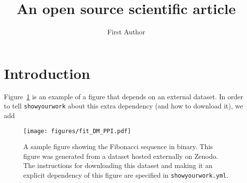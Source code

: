\documentclass[twocolumn]{aastex631}
\begin{document}
\title{An open source scientific article}

\author{First Author}

\begin{abstract}
    \blindtext
\end{abstract}

\section{Introduction}

Figure~\ref{fig:fit_DM_PPI} is an example of a figure that depends on an external dataset.
In order to tell \texttt{showyourwork} about this extra dependency (and how to download it), we add %

\begin{figure}[ht!]
    \begin{centering}
        \texttt{[image: figures/fit\_DM\_PPI.pdf]}
        \caption{
            A sample figure showing the Fibonacci sequence in binary.
            This figure was generated from a dataset hosted externally on Zenodo.
            The instructions for downloading this dataset and making it an explicit dependency of this figure are specified in \texttt{showyourwork.yml}.
        }
        \label{fig:fit_DM_PPI}
    \end{centering}
\end{figure}
\end{document}
